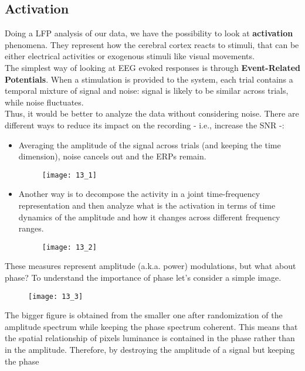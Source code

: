 \subsection{Activation}
Doing a LFP analysis of our data, we have the possibility to look at
\textbf{activation} phenomena. They represent how the cerebral cortex reacts to
stimuli, that can be either electrical activities or exogenous stimuli like visual
movements.\\
The simplest way of looking at EEG evoked responses is through \textbf{Event-Related
    Potentials}. When a stimulation is provided to the system, each trial contains a
temporal mixture of signal and noise: signal is likely to be similar across trials,
while noise fluctuates.\\
Thus, it would be better to analyze the data without considering noise. There are
different ways to reduce its impact on the recording - i.e., increase the SNR -:
\begin{itemize}
    \item Averaging the amplitude of the signal across trials (and keeping the time
          dimension), noise cancels out and the ERPs remain.
          \begin{figure}[H]
              \centering
              \texttt{[image: 13\_1]}
          \end{figure}
    \item Another way is to decompose the activity in a joint time-frequency
          representation and then analyze what is the activation in terms of
          time dynamics of the amplitude and how it changes across different frequency
          ranges.
          \begin{figure}[H]
              \centering
              \texttt{[image: 13\_2]}
          \end{figure}
\end{itemize}
These measures represent amplitude (a.k.a. power) modulations, but what about phase? To
understand the importance of phase let's consider a simple image.
\begin{figure}[H]
    \centering
    \texttt{[image: 13\_3]}
\end{figure}
The bigger figure is obtained from the smaller one after randomization of the amplitude
spectrum while keeping the phase spectrum coherent. This means that the spatial
relationship of pixels luminance is contained in the phase rather than in the
amplitude. Therefore, by destroying the amplitude of a signal but keeping the phase

